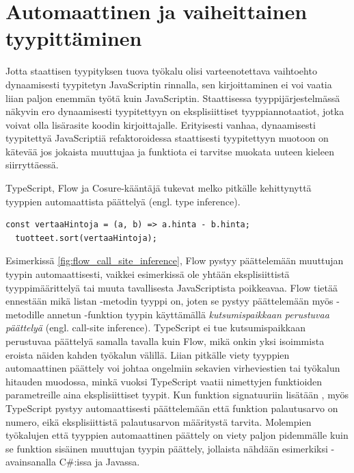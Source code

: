 \section{Automaattinen ja vaiheittainen tyypittäminen}

Jotta staattisen tyypityksen tuova työkalu olisi varteenotettava vaihtoehto
dynaamisesti tyypitetyn JavaScriptin rinnalla, sen kirjoittaminen ei voi vaatia
liian paljon enemmän työtä kuin JavaScriptin. Staattisessa tyyppijärjestelmässä
näkyvin ero dynaamisesti tyypitettyyn on eksplisiittiset tyyppiannotaatiot,
jotka voivat olla lisärasite koodin kirjoittajalle. Erityisesti vanhaa,
dynaamisesti tyypitettyä JavaScriptiä refaktoroidessa staattisesti tyypitettyyn
muotoon on kätevää jos jokaista muuttujaa ja funktiota ei tarvitse muokata
uuteen kieleen siirryttäessä.

TypeScript, Flow ja Cosure-kääntäjä tukevat melko pitkälle kehittynyttä
tyyppien automaattista päättelyä (engl. type inference).
\begin{lstlisting}[caption={
  Flow pystyy tulkitsemaan vertaaHintoja-funktion tyypin automaattisesti, ilman eksplisiittisiä tyyppimäärittelyitä.
  },
  label={fig:flow_call_site_inference},
  aboveskip={20pt}
]
  const vertaaHintoja = (a, b) => a.hinta - b.hinta;
  tuotteet.sort(vertaaHintoja);
\end{lstlisting}
Esimerkissä \ref{fig:flow_call_site_inference}, Flow pystyy päättelemään
muuttujan  tyypin\newline
{} automaattisesti,
vaikkei esimerkissä ole\newline
yhtään eksplisiittistä tyyppimäärittelyä tai
muuta tavallisesta JavaScriptista poikkeavaa. Flow tietää ennestään
mikä listan -metodin tyyppi on, joten se pystyy päättelemään myös
-metodille annetun -funktion tyypin käyttämällä
\textit{kutsumispaikkaan perustuvaa päättelyä} (engl. call-site inference).
TypeScript ei tue kutsumispaikkaan perustuvaa päättelyä samalla tavalla kuin
Flow, mikä onkin yksi isoimmista eroista näiden kahden työkalun välillä.
Liian pitkälle viety tyyppien automaattinen päättely voi johtaa ongelmiin
sekavien virheviestien tai työkalun hitauden muodossa, minkä vuoksi TypeScript
vaatii nimettyjen funktioiden parametreille aina eksplisiittiset tyypit.
Kun funktion signatuuriin lisätään ,
myös TypeScript pystyy automaattisesti päättelemään että funktion palautusarvo
on numero, eikä eksplisiittistä  palautusarvon
määritystä tarvita.
Molempien työkalujen että tyyppien automaattinen
päättely on viety paljon pidemmälle kuin se funktion sisäinen muuttujan
tyypin päättely, jollaista nähdään esimerkiksi
-avainsanalla C\#:issa ja Javassa.

